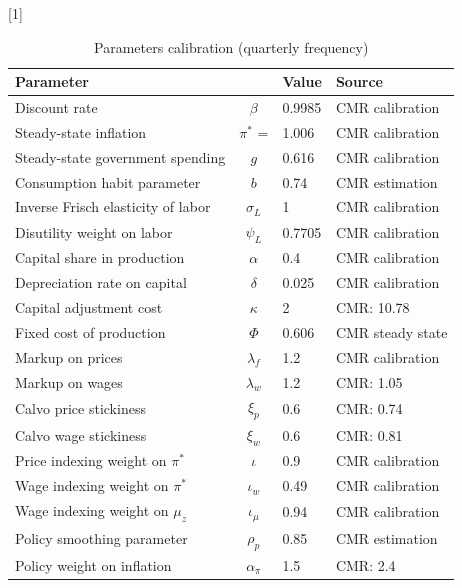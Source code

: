 \renewcommand{\baselinestretch}{1}
\begin{table}[h!]
    \centering
	\caption{Parameters calibration (quarterly frequency)}
	\label{tab: calibration}
{\scalebox{1}[1]{   
\begin{tabular}{lcll}
	\toprule
	 Parameter &  & Value & Source \\\midrule
 Discount rate 	&	 $\beta$ 	&	0.9985	&	CMR calibration 	\\
 Steady-state inflation 	&	 $\pi^*$ = \pi	&	1.006	&	CMR calibration \\ 
 Steady-state government spending	&	 $g$  	&	0.616 	&	CMR calibration	\\[3pt]
 Consumption habit parameter 	&	 $b$ 	&	0.74	&	CMR estimation 	\\
 Inverse Frisch elasticity of labor 	&	 $\sigma_L$ 	&	1	&  CMR calibration	\\
 Disutility weight on labor 	&	 $\psi_L$ 	&	0.7705	&	CMR calibration 	\\[3pt]
 Capital share in production  	&	 $\alpha$ 	&	0.4	&	CMR calibration 	\\
 Depreciation rate on capital 	&	 $\delta$ 	&	0.025	&	CMR calibration 	\\
 Capital adjustment cost 	&	 $\kappa$ 	&	2	&		CMR: 10.78	\\
 Fixed cost of production	&	 $\Phi$  	&	0.606	&	CMR steady state	\\[3pt]
 Markup on prices 	&	 $\lambda_f$ 	&	1.2	&	CMR calibration 	\\
 Markup on wages  	&	 $\lambda_w$ 	&	1.2	&	CMR: 1.05	\\
 Calvo price stickiness 	&	 $\xi_p$ 	&	0.6	&		CMR: 0.74	\\
 Calvo wage stickiness 	&	 $\xi_w$ 	&	0.6	&	CMR: 0.81	\\[3pt]
 Price indexing weight on $\pi^*$ 	&	 $\iota$  	&	0.9	&	CMR calibration 	\\
 Wage indexing weight on $\pi^*$ 	&	 $\iota_{w}$ 	&	0.49	&	CMR calibration 	\\
 Wage indexing weight on $\mu_z$ 	&	 $\iota_{\mu}$ 	&	0.94	&	CMR calibration 	\\[3pt]
 Policy smoothing parameter 	&	 $\rho_p$ 	&	0.85	&	CMR estimation	\\
 Policy weight on inflation 	&	 $\alpha_{\pi}$  	&	1.5	&	CMR: 2.4	\\

\end{tabular}}}
\end{table}
